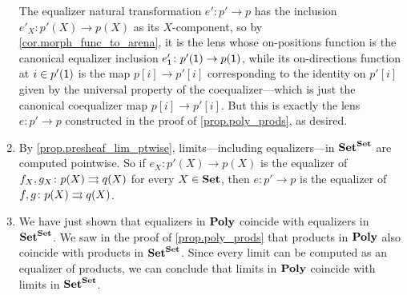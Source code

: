 \documentclass[Book-Poly]{subfiles}
\begin{document}
\begin{exercise}
\begin{solution}
\begin{enumerate}
    The equalizer natural transformation $e'\colon p'\to p$ has the inclusion $e'_X\colon p'(X)\to p(X)$ as its $X$-component, so by \cref{cor.morph_func_to_arena}, it is the lens whose on-positions function is the canonical equalizer inclusion $e'_{\textsf{1}}\colon p'(\textsf{1})\to p(\textsf{1})$, while its on-directions function at $i\in p'(\textsf{1})$ is the map $p[i]\to p'[i]$ corresponding to the identity on $p'[i]$ given by the universal property of the coequalizer---which is just the canonical coequalizer map $p[i]\to p'[i]$.
    But this is exactly the lens $e\colon p'\to p$ constructed in the proof of \cref{prop.poly_prods}, as desired.
    \item By \cref{prop.presheaf_lim_ptwise}, limits---including equalizers---in $\mathbf{Set}^{\mathbf{Set}}$ are computed pointwise.
    So if $e_X\colon p'(X)\to p(X)$ is the equalizer of $f_X,g_X\colon p(X)\rightrightarrows q(X)$ for every $X\in\mathbf{Set}$, then $e\colon p'\to p$ is the equalizer of $f,g\colon p(X)\rightrightarrows q(X)$.
    \item We have just shown that equalizers in $\mathbf{Poly}$ coincide with equalizers in $\mathbf{Set}^{\mathbf{Set}}$.
    We saw in the proof of \cref{prop.poly_prods} that products in $\mathbf{Poly}$ also coincide with products in $\mathbf{Set}^{\mathbf{Set}}$.
    Since every limit can be computed as an equalizer of products, we can conclude that limits in $\mathbf{Poly}$ coincide with limits in $\mathbf{Set}^{\mathbf{Set}}$.
\end{enumerate}
\end{solution}
\end{exercise}
\end{document}
